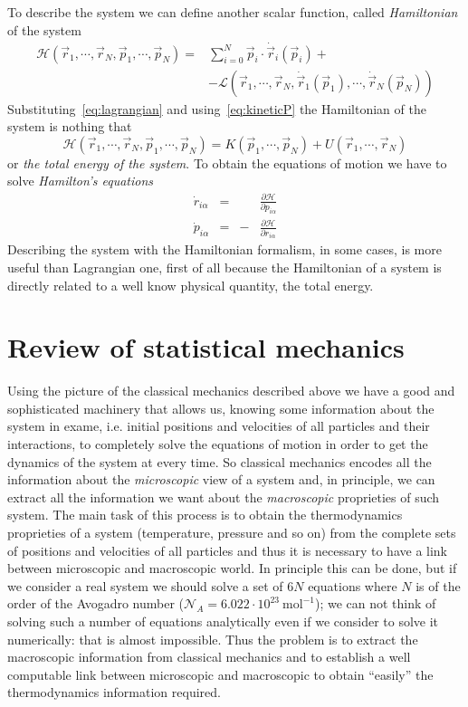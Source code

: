 To describe the system we can define another scalar function, called \textit{Hamiltonian} of the system
\begin{align*}
	\mathcal{H}(\vec r_1,\cdots,\vec r_N, \vec p_1, \cdots, \vec p_N) = &\sum_{i=0}^N \vec p_i \cdot \dot{\vec r}_i(\vec p_i) + \nonumber \\
	&-\mathcal{L}(\vec r_1, \cdots, \vec r_N, \dot{\vec r}_1(\vec p_1),\cdots,\dot{\vec r}_N(\vec p_N))
\end{align*}
Substituting~\eqref{eq:lagrangian} and using~\eqref{eq:kineticP} the Hamiltonian of the system is nothing that
\begin{equation}
	\mathcal{H}(\vec r_1,\cdots,\vec r_N, \vec p_1, \cdots, \vec p_N) = K(\vec p_1, \cdots, \vec p_N) + U(\vec r_1,\cdots,\vec r_N)
	\label{eq:hamiltonian}
\end{equation}
or \textit{the total energy of the system}. To obtain the equations of motion we have to solve \textit{Hamilton's equations}
\begin{equation}
	\begin{aligned}
		\dot r_{i\alpha} &=& &\frac{\partial\mathcal{H}}{\partial p_{i\alpha}} \\
		\dot p_{i\alpha} &=&-&\frac{\partial\mathcal{H}}{\partial r_{i\alpha}}
	\end{aligned}
	\label{eq:eqhamilton}
\end{equation}
Describing the system with the Hamiltonian formalism, in some cases, is more useful than Lagrangian one, first of
all because the Hamiltonian of a system is directly related to a well know physical quantity, the total energy.

\section{Review of statistical mechanics}
\label{sec:statmec}
Using the picture of the classical mechanics described above we have a good and sophisticated machinery that allows us, knowing some information about the system in exame, i.e. initial positions and velocities of all particles and their interactions, to completely solve the equations of motion in order to get the dynamics of the system at every time. So classical mechanics encodes all the information about the \textit{microscopic} view of a system and, in principle, we can extract all the information we want about the \textit{macroscopic} proprieties of such system.
The main task of this process is to obtain the thermodynamics proprieties of a system (temperature, pressure and so on) from the complete sets of positions and velocities of all particles and thus it is necessary to have a link between microscopic and macroscopic world. In principle this can be done, but if we consider a real system we should solve a set of $6N$ equations where $N$ is of the order of the Avogadro number ($\mathcal{N}_A = 6.022 \cdot 10^{23}~\text{mol}^{-1}$); we can not think of solving such a number of equations analytically even if we consider to solve it numerically: that is almost impossible. Thus the problem is to extract the macroscopic information from classical mechanics and to establish a well computable link between microscopic and macroscopic to obtain ``easily'' the thermodynamics information required.

